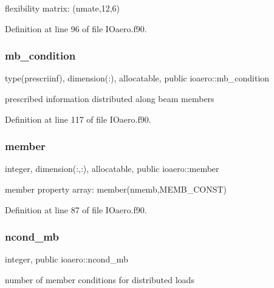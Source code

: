 flexibility matrix\+: (nmate,12,6) 



Definition at line 96 of file I\+Oaero.\+f90.

\mbox{\label{namespaceioaero_a2463929ef049b49fe7b49011c66cc806}} 
\subsubsection{\texorpdfstring{mb\+\_\+condition}{mb\_condition}}
{\footnotesize\ttfamily type(prescriinf), dimension(\+:), allocatable, public ioaero\+::mb\+\_\+condition}



prescribed information distributed along beam members 



Definition at line 117 of file I\+Oaero.\+f90.

\mbox{\label{namespaceioaero_ae040b39fe109c45b001985415e230ec3}} 
\subsubsection{\texorpdfstring{member}{member}}
{\footnotesize\ttfamily integer, dimension(\+:,\+:), allocatable, public ioaero\+::member}



member property array\+: member(nmemb,\+M\+E\+M\+B\+\_\+\+C\+O\+N\+S\+T) 



Definition at line 87 of file I\+Oaero.\+f90.

\mbox{\label{namespaceioaero_ab9193f4ff70a22ae5858118fc653f22b}} 
\subsubsection{\texorpdfstring{ncond\+\_\+mb}{ncond\_mb}}
{\footnotesize\ttfamily integer, public ioaero\+::ncond\+\_\+mb}



number of member conditions for distributed loads 



